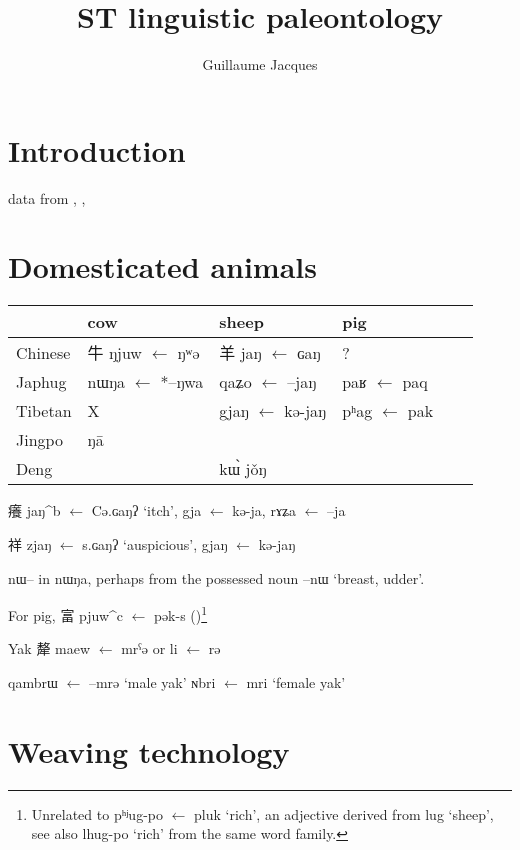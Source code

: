 \documentclass[oldfontcommands,oneside,a4paper,11pt]{article}
\newcommand{\ipa}[1]{{\phon #1}} %
\newcommand{\pform}[2]{\ipa{#1} $\leftarrow$ \ipa{*#2}}
\newcommand{\zhc}[3]{{\cn #1} \pform{#2}{#3}}
\begin{document}
 
\title{ST linguistic paleontology}
\author{Guillaume Jacques}
\maketitle

\section{Introduction}
\citet{sagart11rice}

\citet{bradley11crops}


data from \citet{xu83jingpo}, \citet{bodrgya}, \citet{jackson93}
  \section{Domesticated animals} 
\begin{table}[H]
\begin{tabular}{llllll}
\toprule
&cow &  sheep & pig \\
\midrule
Chinese & \zhc{牛}{ŋjuw}{ŋʷə}&  \zhc{羊}{jaŋ}{ɢaŋ} & ?\\
Japhug& \pform{nɯŋa}{*--ŋwa} & \pform{qaʑo}{--jaŋ} & \pform{paʁ}{paq}\\
Tibetan& X & \pform{gjaŋ}{kə-jaŋ} & \pform{pʰag}{pak}\\
\bottomrule
Jingpo &\ipa{ŋā}&& \\
Deng & & \ipa{kɯ̀ jǒŋ} \\
\end{tabular}
\end{table}
  
  
  \zhc{癢}{jaŋ^b}{Cə.ɢaŋʔ} `itch', \pform{gja}{kə-ja}, \pform{rɤʑa}{--ja}
  
  \zhc{祥}{zjaŋ}{s.ɢaŋʔ} `auspicious', \pform{gjaŋ}{kə-jaŋ}
  
  
\ipa{nɯ--} in \ipa{nɯŋa}, perhaps from the possessed noun \ipa{--nɯ} `breast, udder'.  
  
For pig,  \zhc{富}{pjuw^c}{pək-s} (\citealt[]{sagart11homeland})\footnote{Unrelated to \pform{pʰʲug-po}{pluk} `rich', an adjective derived from \ipa{lug} `sheep', see also \ipa{lhug-po} `rich' from the same word family.}


Yak
\zhc{犛}{maew}{mrˁə} or \pform{li}{rə} 

\pform{qambrɯ}{--mrə} `male yak'  \pform{ɴbri}{mri} `female yak'
  
  \section{Weaving technology}
  
\end{document}
